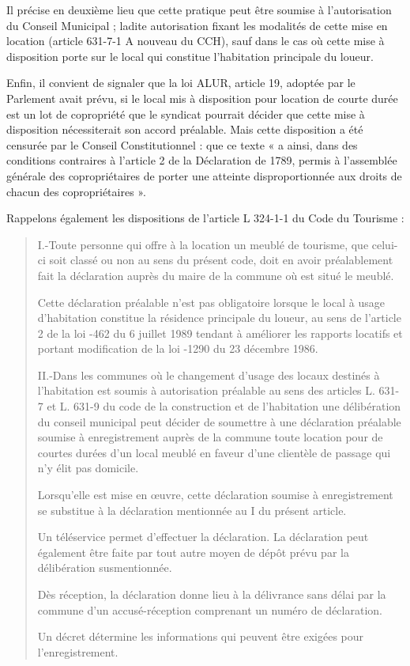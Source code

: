 		Il précise en deuxième lieu que cette pratique peut être soumise à l’autorisation du Conseil Municipal ; ladite autorisation fixant les modalités de cette mise en location (article 631-7-1 A nouveau du CCH), sauf dans le cas où cette mise à disposition porte sur le local qui constitue l’habitation principale du loueur.
		
		Enfin, il convient de signaler que la loi ALUR, article 19, adoptée par le Parlement avait prévu, si le local mis à disposition pour location de courte durée est un lot de copropriété que le syndicat pourrait décider que cette mise à disposition nécessiterait son accord préalable. Mais cette disposition a été censurée par le Conseil Constitutionnel : que ce texte « a ainsi, dans des conditions contraires à l'article 2 de la Déclaration de 1789, permis à l'assemblée générale des copropriétaires de porter une atteinte disproportionnée aux droits de chacun des copropriétaires ».
		
		Rappelons également les dispositions de l’article L 324-1-1 du Code du Tourisme :
		\begin{quote}
			I.-Toute personne qui offre à la location un meublé de tourisme, que celui-ci soit classé ou non au sens du présent code, doit en avoir préalablement fait la déclaration auprès du maire de la commune où est situé le meublé.
			
			Cette déclaration préalable n'est pas obligatoire lorsque le local à usage d'habitation constitue la résidence principale du loueur, au sens de l'article 2 de la loi -462 du 6 juillet 1989 tendant à améliorer les rapports locatifs et portant modification de la loi -1290 du 23 décembre 1986.
			
			II.-Dans les communes où le changement d'usage des locaux destinés à l'habitation est soumis à autorisation préalable au sens des articles L. 631-7 et L. 631-9 du code de la construction et de l'habitation une délibération du conseil municipal peut décider de soumettre à une déclaration préalable soumise à enregistrement auprès de la commune toute location pour de courtes durées d'un local meublé en faveur d'une clientèle de passage qui n'y élit pas domicile.
			
			Lorsqu'elle est mise en œuvre, cette déclaration soumise à enregistrement se substitue à la déclaration mentionnée au I du présent article.
			
			Un téléservice permet d'effectuer la déclaration. La déclaration peut également être faite par tout autre moyen de dépôt prévu par la délibération susmentionnée.
			
			Dès réception, la déclaration donne lieu à la délivrance sans délai par la commune d'un accusé-réception comprenant un numéro de déclaration.
			
			Un décret détermine les informations qui peuvent être exigées pour l'enregistrement.
		\end{quote}
		
